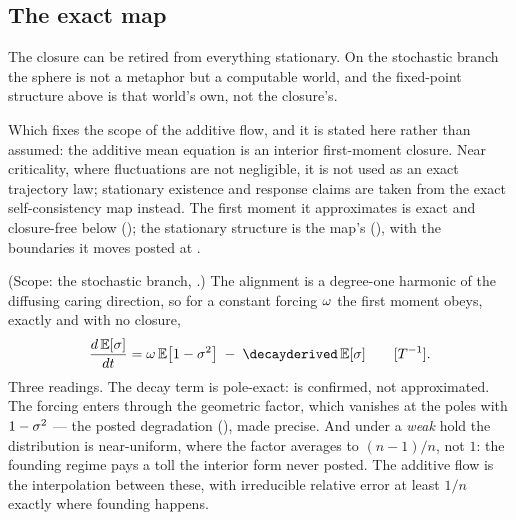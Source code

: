 \documentclass[../main]{subfiles}
\begin{document}
\subsection{The exact map}
\label{subsec:fixed:exact}
%
The closure can be retired from everything stationary. On the stochastic branch the
sphere is not a metaphor but a computable world, and the fixed-point structure above is
that world's own, not the closure's.

Which fixes the scope of the additive flow, and it is stated here rather than assumed:
the additive mean equation is an interior first-moment closure. Near criticality, where
fluctuations are not negligible, it is not used as an exact trajectory law; stationary
existence and response claims are taken from the exact self-consistency map instead. The
first moment it approximates is exact and closure-free below (); the
stationary structure is the map's (), with the boundaries it moves posted
at .

\begin{theorem}%
  (Scope: the stochastic branch, .) The alignment is a degree-one
  harmonic of the diffusing caring direction, so for a constant forcing $\omega$ the
  first moment obeys, exactly and with no closure,
  \begin{equation}
    \frac{d\,\mathbb E[\leanbare]}{dt}
      =\will\,\mathbb E\bigl[1-\leanbare^{2}\bigr]\;-\;\decayderived\,\mathbb E[\leanbare]
    \qquad\dimrate.
    \label{eq:dyn:moment}
  \end{equation}
  Three readings. The decay term is pole-exact:  is confirmed, not
  approximated. The forcing enters through the geometric factor, which vanishes at the
  poles with $1-\sigma^{2}$ --- the posted degradation (), made
  precise. And under a \emph{weak} hold the distribution is near-uniform, where the
  factor averages to $(n-1)/n$, not $1$: the founding regime pays a toll the interior
  form never posted. The additive flow  is the interpolation between
  these, with irreducible relative error at least $1/n$ exactly where founding happens.
\end{theorem}
\end{document}
